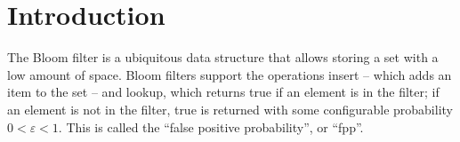 \documentclass[letterpaper,twocolumn,10pt]{article}
\newcommand{\TCF}{SCF}
\newcommand{\MTCF}{MSCF}
\newcommand{\TCF}{TCF}
\newcommand{\MTCF}{MTCF}
\begin{document}



\section{Introduction}






The Bloom filter is a ubiquitous data structure that allows storing a set with a low amount of space.
Bloom filters support the operations insert -- which adds an item to the set -- and lookup, which returns true if an element is in the filter; if an element is not in the filter, true is returned with some configurable probability $0 < \varepsilon < 1$.
This is called the ``false positive probability'', or ``fpp''.
\end{document}
